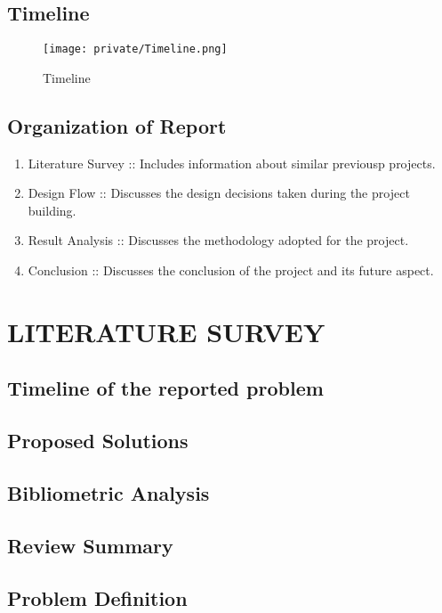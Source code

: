 \documentclass[14pt]{extarticle}
\begin{document}
\subsection{Timeline}

\begin{figure}[!htb]
    \begin{center}
        \texttt{[image: private/Timeline.png]}
    \end{center}
    \caption{Timeline}
\end{figure}

\subsection{Organization of Report}

\begin{enumerate}
    \item Literature Survey :: Includes information about similar previousp projects.
    \item Design Flow :: Discusses the design decisions taken during the project building.
    \item Result Analysis :: Discusses the methodology adopted for the project.
    \item Conclusion :: Discusses the conclusion of the project and its future aspect.
\end{enumerate}


\newpage
\section{LITERATURE SURVEY}

\subsection{Timeline of the reported problem}
\subsection{Proposed Solutions}
\subsection{Bibliometric Analysis}
\subsection{Review Summary}
\subsection{Problem Definition}
\end{document}

